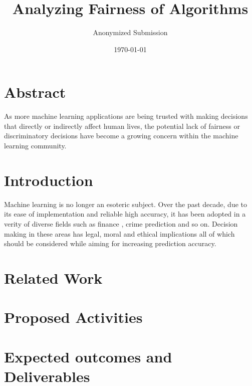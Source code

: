 \documentclass[11pt]{article}
\begin{document}
\title{Analyzing Fairness of Algorithms}
\author{Anonymized Submission}
\date{\today}
\maketitle

\section{Abstract}
As more machine learning applications are being trusted with making decisions that directly or indirectly affect human lives, the potential lack of fairness or discriminatory decisions have become a growing concern within the machine learning community. 
\section{Introduction}
Machine learning is no longer an esoteric subject. Over the past decade, due to its ease of implementation and reliable high accuracy, it has been adopted in a verity of diverse fields such as finance  \cite{huang2007credit, tsai2008using, galindo2000credit}, crime prediction \cite{brennan2009evaluating} and so on. Decision making in these areas has legal, moral and ethical implications all of which should be considered while aiming for increasing prediction accuracy.

\section{Related Work}

\section{Proposed Activities}

\section{Expected outcomes and Deliverables}
 

 
\end{document}
